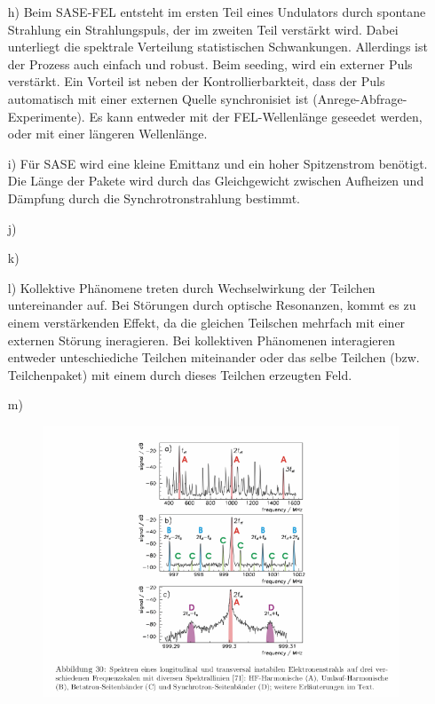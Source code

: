 \documentclass[11pt,a4paper]{article}
\begin{document}
\begin{itemize}
		\item[h)]
			Beim SASE-FEL entsteht im ersten Teil eines Undulators durch spontane Strahlung ein Strahlungspuls,
			der im zweiten Teil verstärkt wird. 
			Dabei unterliegt die spektrale Verteilung statistischen Schwankungen.
			Allerdings ist der Prozess auch einfach und robust.
			Beim seeding, wird ein externer Puls verstärkt.
			Ein Vorteil ist neben der Kontrollierbarkteit, 
			dass der Puls automatisch mit einer externen Quelle synchronisiet ist (Anrege-Abfrage-Experimente).
			Es kann entweder mit der FEL-Wellenlänge geseedet werden, oder mit einer längeren Wellenlänge.
		
		\item[i)]
			Für SASE wird eine kleine Emittanz und ein hoher Spitzenstrom benötigt.
			Die Länge der Pakete wird durch das Gleichgewicht zwischen Aufheizen und Dämpfung durch die Synchrotronstrahlung bestimmt.
		
		\item[j)]
			
		
		\item[k)]
		
		
		\item[l)]
			Kollektive Phänomene treten durch Wechselwirkung der Teilchen untereinander auf.
			Bei Störungen durch optische Resonanzen, kommt es zu einem verstärkenden Effekt, 
			da die gleichen Teilschen mehrfach mit einer externen Störung ineragieren.
			Bei kollektiven Phänomenen interagieren entweder unteschiediche Teilchen miteinander 
			oder das selbe Teilchen (bzw. Teilchenpaket) mit einem durch dieses Teilchen erzeugten Feld.

		\item[m)]
			\begin{figure}[H]
				\centering
				\includegraphics[width=\textwidth]{sprektrum.png}
			\end{figure}
		

\end{itemize}
\end{document}
